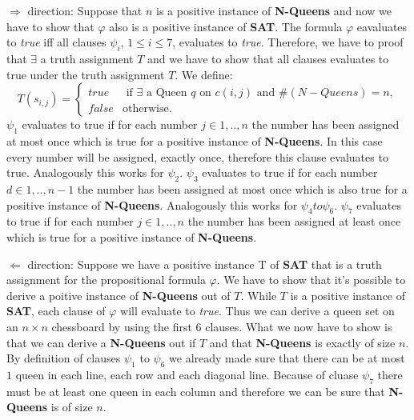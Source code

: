 \documentclass[11pt]{article}
\begin{document}
$\Rightarrow $ direction:\newline
Suppose that $n$ is a positive instance of \textbf{N-Queens} and now we have
to show that $\varphi $ also is a positive instance of \textbf{SAT}.\newline
The formula $\varphi $ eavaluates to \textit{true} iff all clauses $\psi _{i}
$, $1\leq i\leq 7$, evaluates to \textit{true}. Therefore, we have to proof
that $\exists $ a truth assignment $T$ and we have to show that all clauses
evaluates to true under the truth assignment $T$. We define:\newline
\begin{equation*}
T(s_{i,j})=\left\{ 
\begin{array}{cl}
true & \text{ if }\exists \text{ a Queen }q\text{ on }c(i,j)\text{ and }%
\#(N-Queens)=n, \\ 
false & \text{otherwise.}%
\end{array}%
\right. 
\end{equation*}%
$\psi _{1}$ evaluates to true if for each number $j\in {1,..,n}$ the number
has been assigned at most once which is true for a positive instance of 
\textbf{N-Queens}. In this case every number will be assigned, exactly once,
therefore this clause evaluates to true.\newline
Analogously this works for $\psi _{2}$.\newline
$\psi _{3}$ evaluates to true if for each number $d\in {1,..,n-1}$ the
number has been assigned at most once which is also true for a positive
instance of \textbf{N-Queens}.\newline
Analogously this works for $\psi _{4}to\psi _{6}$.\newline
$\psi _{7}$ evaluates to true if for each number $j\in {1,..,n}$ the number
has been assigned at least once which is true for a positive instance of 
\textbf{N-Queens}.\newline

\noindent $\Leftarrow $ direction:\newline
Suppose we have a positive instance T of \textbf{SAT} that is a truth
assignment for the propositional formula $\varphi $. We have to show that
it's possible to derive a poitive instance of \textbf{N-Queens} out of $T$.%
\newline
While $T$ is a positive instance of \textbf{SAT}, each clause of $\varphi $
will evaluate to \textit{true}. Thus we can derive a queen set on an $%
n\times n$ chessboard by using the first 6 clauses. What we now have to show
is that we can derive a \textbf{N-Queens} out if $T$ and that \textbf{%
N-Queens} is exactly of size $n$.\newline
By definition of clauses $\psi _{1}$ to $\psi _{6}$ we already made sure
that there can be at most $1$ queen in each line, each row and each diagonal
line. Because of cluase $\psi _{7}$ there must be at least one queen in each
column and therefore we can be sure that \textbf{N-Queens} is of size $n$.
\end{document}
